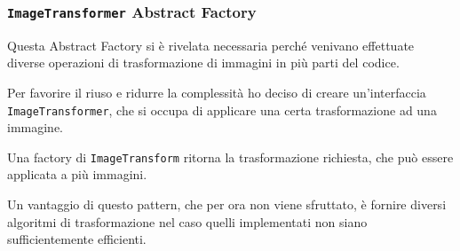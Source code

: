 \documentclass[a4paper,12pt]{report}
\begin{document}
    \subsubsection{\texttt{ImageTransformer} Abstract Factory}
    \par
    \par Questa Abstract Factory si è rivelata necessaria perché venivano effettuate diverse operazioni di trasformazione di
    immagini in più parti del codice.
    \par Per favorire il riuso e ridurre la complessità ho deciso di creare un'interfaccia \texttt{ImageTransformer}, che si occupa di applicare una certa trasformazione ad una immagine.
    \par Una factory di \texttt{ImageTransform} ritorna la trasformazione richiesta, che può essere applicata a più immagini.
    \par Un vantaggio di questo pattern, che per ora non viene sfruttato, è fornire diversi algoritmi di trasformazione
    nel caso quelli implementati non siano sufficientemente efficienti.
\end{document}
